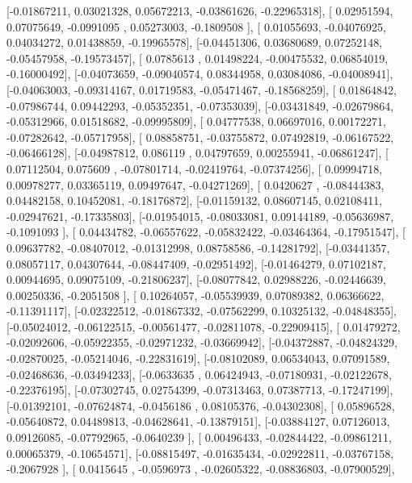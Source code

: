 \documentclass{article}
\begin{document}
       [-0.01867211,  0.03021328,  0.05672213, -0.03861626, -0.22965318],
       [ 0.02951594,  0.07075649, -0.0991095 ,  0.05273003, -0.1809508 ],
       [ 0.01055693, -0.04076925,  0.04034272,  0.01438859, -0.19965578],
       [-0.04451306,  0.03680689,  0.07252148, -0.05457958, -0.19573457],
       [ 0.0785613 ,  0.01498224, -0.00475532,  0.06854019, -0.16000492],
       [-0.04073659, -0.09040574,  0.08344958,  0.03084086, -0.04008941],
       [-0.04063003, -0.09314167,  0.01719583, -0.05471467, -0.18568259],
       [ 0.01864842, -0.07986744,  0.09442293, -0.05352351, -0.07353039],
       [-0.03431849, -0.02679864, -0.05312966,  0.01518682, -0.09995809],
       [ 0.04777538,  0.06697016,  0.00172271, -0.07282642, -0.05717958],
       [ 0.08858751, -0.03755872,  0.07492819, -0.06167522, -0.06466128],
       [-0.04987812,  0.086119  ,  0.04797659,  0.00255941, -0.06861247],
       [ 0.07112504,  0.075609  , -0.07801714, -0.02419764, -0.07374256],
       [ 0.09994718,  0.00978277,  0.03365119,  0.09497647, -0.04271269],
       [ 0.0420627 , -0.08444383,  0.04482158,  0.10452081, -0.18176872],
       [-0.01159132,  0.08607145,  0.02108411, -0.02947621, -0.17335803],
       [-0.01954015, -0.08033081,  0.09144189, -0.05636987, -0.1091093 ],
       [ 0.04434782, -0.06557622, -0.05832422, -0.03464364, -0.17951547],
       [ 0.09637782, -0.08407012, -0.01312998,  0.08758586, -0.14281792],
       [-0.03441357,  0.08057117,  0.04307644, -0.08447409, -0.02951492],
       [-0.01464279,  0.07102187,  0.00944695,  0.09075109, -0.21806237],
       [-0.08077842,  0.02988226, -0.02446639,  0.00250336, -0.2051508 ],
       [ 0.10264057, -0.05539939,  0.07089382,  0.06366622, -0.11391117],
       [-0.02322512, -0.01867332, -0.07562299,  0.10325132, -0.04848355],
       [-0.05024012, -0.06122515, -0.00561477, -0.02811078, -0.22909415],
       [ 0.01479272, -0.02092606, -0.05922355, -0.02971232, -0.03669942],
       [-0.04372887, -0.04824329, -0.02870025, -0.05214046, -0.22831619],
       [-0.08102089,  0.06534043,  0.07091589, -0.02468636, -0.03494233],
       [-0.0633635 ,  0.06424943, -0.07180931, -0.02122678, -0.22376195],
       [-0.07302745,  0.02754399, -0.07313463,  0.07387713, -0.17247199],
       [-0.01392101, -0.07624874, -0.0456186 ,  0.08105376, -0.04302308],
       [ 0.05896528, -0.05640872,  0.04489813, -0.04628641, -0.13879151],
       [-0.03884127,  0.07126013,  0.09126085, -0.07792965, -0.0640239 ],
       [ 0.00496433, -0.02844422, -0.09861211,  0.00065379, -0.10654571],
       [-0.08815497, -0.01635434, -0.02922811, -0.03767158, -0.2067928 ],
       [ 0.0415645 , -0.0596973 , -0.02605322, -0.08836803, -0.07900529],
\end{document}
